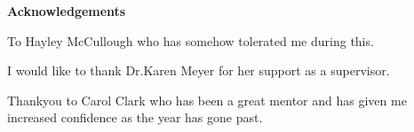 
\begin{center}
\Large\textbf{Acknowledgements}
\end{center}

\begin{flushleft}

To Hayley McCullough who has somehow tolerated me during this. 

\;

I would like to thank Dr.Karen Meyer for her support as a supervisor.

\;

Thankyou to Carol Clark who has been a great mentor and has given me increased confidence as the year has gone past.

\;


\end{flushleft}